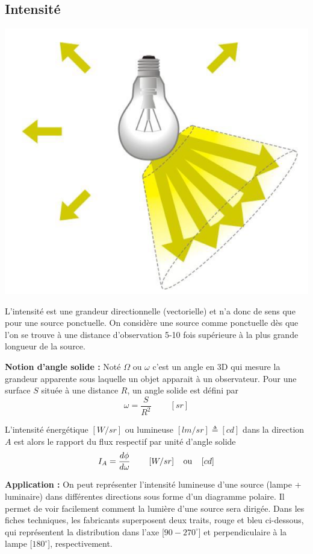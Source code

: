 \documentclass[11pt]{report}
\begin{document}
\subsection{Intensité}
\begin{minipage}{0.2\linewidth}
\centering
\includegraphics[scale=0.2]{intensite}
\end{minipage}
\begin{minipage}{0.75\linewidth}
L'intensité est une grandeur directionnelle (vectorielle) et n'a donc de sens que pour une source ponctuelle. On considère une source comme ponctuelle dès que l'on se trouve à une distance d'observation 5-10 fois supérieure à la plus grande longueur de la source.
\end{minipage}

\vspace{5mm}
\textbf{Notion d'angle solide :} Noté $\Omega$ ou $\omega$ c'est un angle en 3D qui mesure la grandeur apparente sous laquelle un objet apparait à un observateur. Pour une surface $S$ située à une distance $R$, un angle solide est défini par
$$\omega = \frac{S}{R^2} \;\;\;\;\;\;\;\; [sr]$$ 

L'intensité énergétique $[W/sr]$ ou lumineuse $[lm/sr]\triangleq[cd]$ dans la direction $A$ est alors le rapport du flux respectif par unité d'angle solide
$$I_A = \frac{d\phi}{d\omega}\;\;\;\;\;\;\;\; [W/sr]\;\;\;\;\textup{ou} \;\;\;\; [cd]$$

\vspace{5mm}
\textbf{Application :} On peut représenter l'intensité lumineuse d'une source (lampe + luminaire) dans différentes directions sous forme d'un diagramme polaire. Il permet de voir facilement comment la lumière d'une source sera dirigée. Dans les fiches techniques, les fabricants superposent deux traits, rouge et bleu ci-dessous, qui représentent la distribution dans l'axe [$90-270^{\circ}$] et perpendiculaire à la lampe [$180^{\circ}$], respectivement. 
\end{document}
